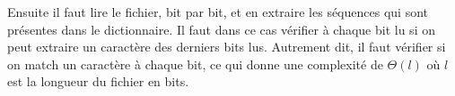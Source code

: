 \documentclass[10pt,a4paper]{article}
\begin{document}
	Ensuite il faut lire le fichier, bit par bit, et en extraire les séquences qui sont présentes dans le dictionnaire.
	Il faut dans ce cas vérifier à chaque bit lu si on peut extraire un caractère des derniers bits lus. Autrement dit, il faut vérifier si on match un caractère à chaque bit, ce qui donne une complexité de $\Theta(l)$ où $l$ est la longueur du fichier en bits.


\end{document}
